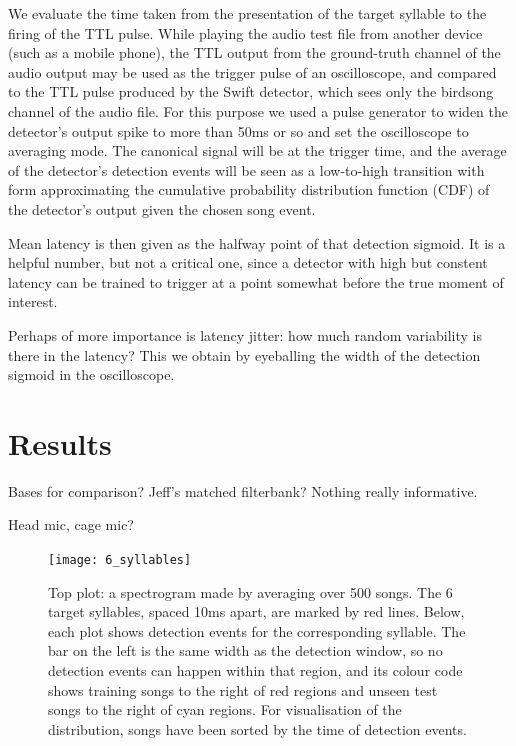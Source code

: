 \documentclass{article}
\begin{document}
We evaluate the time taken from the presentation of the target
syllable to the firing of the TTL pulse. While playing the audio test
file from another device (such as a mobile phone), the TTL output from
the ground-truth channel of the audio output may be used as the
trigger pulse of an oscilloscope, and compared to the TTL pulse
produced by the Swift detector, which sees only the birdsong channel
of the audio file. For this purpose we used a pulse generator to widen
the detector's output spike to more than 50ms or so and set the
oscilloscope to averaging mode. The canonical signal will be at the
trigger time, and the average of the detector's detection events will
be seen as a low-to-high transition with form approximating the
cumulative probability distribution function (CDF) of the detector's
output given the chosen song event.

Mean latency is then given as the halfway point of that detection
sigmoid. It is a helpful number, but not a critical one, since a
detector with high but constent latency can be trained to trigger at a
point somewhat before the true moment of interest.

Perhaps of more importance is latency jitter: how much random
variability is there in the latency? This we obtain by eyeballing the
width of the detection sigmoid in the oscilloscope.


\section{Results}
\label{sec:results}

Bases for comparison? Jeff's matched filterbank? Nothing really
informative.


Head mic, cage mic?

\begin{figure}
  \texttt{[image: 6\_syllables]}
  \caption{Top plot: a spectrogram made by averaging over 500 songs. The 6 target syllables, spaced 10ms apart, are marked by red lines. Below, each plot shows detection events for the corresponding syllable. The bar on the left is the same width as the detection window, so no detection events can happen within that region, and its colour code shows training songs to the right of red regions and unseen test songs to the right of cyan regions. For visualisation of the distribution, songs have been sorted by the time of detection events.}
  \label{fig:sixsyllables}
\end{figure}
\end{document}
